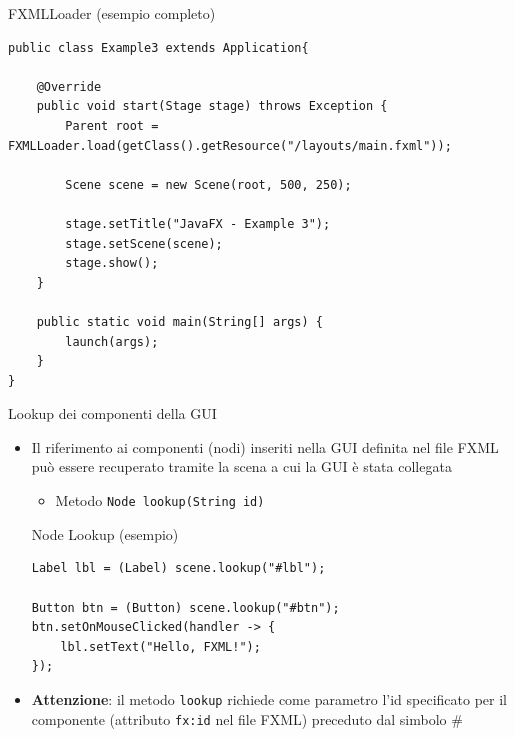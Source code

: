 \documentclass[presentation]{beamer}
\begin{document}
\begin{frame}[fragile]{FXMLLoader (esempio completo)}
\begin{lstlisting}
public class Example3 extends Application{

	@Override
	public void start(Stage stage) throws Exception {
		Parent root = FXMLLoader.load(getClass().getResource("/layouts/main.fxml"));
		
		Scene scene = new Scene(root, 500, 250);
		
		stage.setTitle("JavaFX - Example 3");
		stage.setScene(scene);
		stage.show();
	}
	
	public static void main(String[] args) {
		launch(args);
	}
}
\end{lstlisting}
\end{frame}

\begin{frame}[fragile]{Lookup dei componenti della GUI}
\begin{itemize}
\item Il riferimento ai componenti (nodi) inseriti nella GUI definita nel file FXML può essere recuperato tramite la scena a cui la GUI è stata collegata
\begin{itemize}
\item Metodo \texttt{Node lookup(String id)}
\end{itemize}

\begin{block}{Node Lookup (esempio)}
\begin{lstlisting}
Label lbl = (Label) scene.lookup("#lbl");
		
Button btn = (Button) scene.lookup("#btn");
btn.setOnMouseClicked(handler -> {
	lbl.setText("Hello, FXML!");
});
\end{lstlisting}
\end{block}
\item \textbf{Attenzione}: il metodo \texttt{lookup} richiede come parametro l'id specificato per il componente (attributo \texttt{fx:id} nel file FXML) preceduto dal simbolo \#
\end{itemize}
\end{frame}
\end{document}
